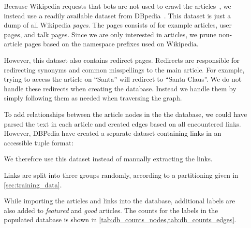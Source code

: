Because Wikipedia requests that bots are not used to crawl the articles~\cite{wiki-bots}, we instead use a readily available dataset from DBpedia~\cite{dbpedia}. This dataset is just a dump of all Wikipedia \emph{pages}. The pages consists of for example articles, user pages, and talk pages. Since we are only interested in articles, we prune non-article pages based on the namespace prefixes used on Wikipedia.

However, this dataset also contains redirect pages. Redirects are responsible for redirecting synonyms and common misspellings to the main article. For example, trying to access the article on ``Santa'' will redirect to ``Santa Claus''. We do not handle these redirects when creating the database. Instead we handle them by simply following them as needed when traversing the graph.

To add relationships between the article nodes in the the database, we could have parsed the text in each article and created edges based on all encountered links. However, DBPedia have created a separate dataset containing links in an accessible tuple format:
\begin{center}
\end{center}

We therefore use this dataset instead of manually extracting the links.

Links are split into three groups randomly, according to a partitioning given in \cref{sec:training_data}. 

While importing the articles and links into the database, additional labels are also added to \emph{featured} and \emph{good} articles.
The counts for the labels in the populated database is shown in \cref{tab:db_counts_nodes,tab:db_counts_edges}.



